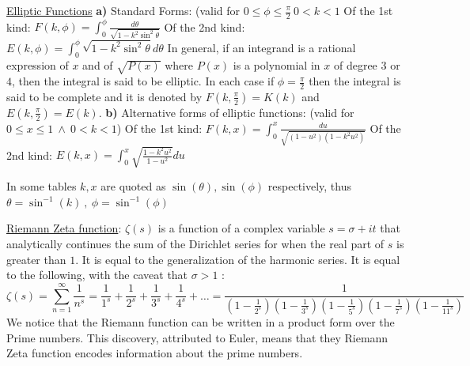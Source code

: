 \documentclass[12pt]{article}
\begin{document}
\begin{flushleft}
	\uline{Elliptic Functions} \linebreak 
	\textbf{a)} Standard Forms: (valid for $0 \leq \phi \leq \frac{\pi}{2} \ 0 < k < 1$ \linebreak 
	\textbullet \quad Of the 1st kind: $\displaystyle F(k,\phi) = \int_0^{\phi} \frac{d\theta}{\sqrt{1-k^2 \sin ^2 \theta}} $ \linebreak 
	\textbullet \quad Of the 2nd kind: $\displaystyle E(k,\phi) = \int_0^{\phi} \sqrt{1-k^2 \sin ^2 \theta} d\theta $ \linebreak 
	\textbullet \quad In general, if an integrand is a rational expression of $x$ and of $\sqrt{P(x)}$ where $P(x)$ is a polynomial in $x$ of degree $3$ or $4$, then the integral is said to be elliptic. \linebreak 
	\textbullet \quad In each case if $\displaystyle \phi = \frac{\pi}{2}$ then the integral is said to be complete and it is denoted by $\displaystyle F\left( k, \frac{\pi}{2} \right) = K(k) $ and $\displaystyle E\left( k, \frac{\pi}{2} \right) = E(k)$. \linebreak 
	\textbf{b)} Alternative forms of elliptic functions: (valid for $0 \leq x \leq 1 \ \land \ 0 < k < 1$) \linebreak 
	\textbullet \quad Of the 1st kind: $\displaystyle F(k,x) = \int_0^x \frac{du}{\sqrt{(1-u^2)(1-k^2u^2)}}$ \linebreak 
	\textbullet \quad Of the 2nd kind: $\displaystyle E(k,x) = \int_0^x \sqrt{\frac{1-k^2u^2}{1-u^2}} du $ \linebreak 
	
	In some tables $k,x$ are quoted as $\sin (\theta), \sin (\phi)$ respectively, thus $\theta = \sin ^{-1} (k) \ , \ \phi = \sin ^{-1} ( \phi )$ \linebreak 
	
	\textbullet \quad \uline{Riemann Zeta function}: $\zeta (s)$ is a function of a complex variable $s = \sigma + it$ that analytically continues the sum of the Dirichlet series for when the real part of $s$ is greater than $1$. It is equal to the generalization of the harmonic series. It is equal to the following, with the caveat that $\sigma > 1$  :   \linebreak 
	$$\displaystyle \zeta (s) = \sum \limits_{n=1}^{\infty} \frac{1}{n^s} = \frac{1}{1^s} + \frac{1}{2^s} + \frac{1}{3^s} + \frac{1}{4^s} + \ldots = \frac{1}{(1-\frac{1}{2^s}) (1-\frac{1}{3^s}) (1 - \frac{1}{5^s}) (1-\frac{1}{7^s}) (1-\frac{1}{11^s}) }  $$ 
	We notice that the Riemann function can be written in a product form over the Prime numbers. This discovery, attributed to Euler, means that they Riemann Zeta function encodes information about the prime numbers. \linebreak 


\end{flushleft}
\end{document}
